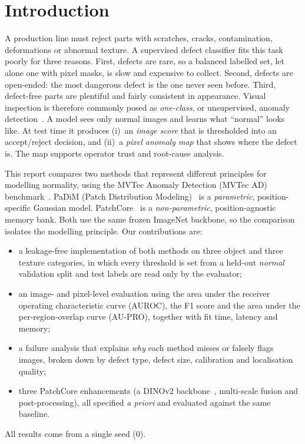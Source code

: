 \section{Introduction}
\label{sec:intro}

A production line must reject parts with scratches, cracks, contamination, deformations or abnormal texture.
A supervised defect classifier fits this task poorly for three reasons.
First, defects are rare, so a balanced labelled set, let alone one with pixel masks, is slow and expensive to collect.
Second, defects are open-ended: the most dangerous defect is the one never seen before.
Third, defect-free parts are plentiful and fairly consistent in appearance.
Visual inspection is therefore commonly posed as \emph{one-class}, or unsupervised, anomaly detection~\cite{bergmann2019mvtec,bergmann2021mvtec}.
A model sees only normal images and learns what ``normal'' looks like.
At test time it produces (i)~an \emph{image score} that is thresholded into an accept/reject decision, and (ii)~a \emph{pixel anomaly map} that shows where the defect is.
The map supports operator trust and root-cause analysis.

This report compares two methods that represent different principles for modelling normality, using the MVTec Anomaly Detection (MVTec AD) benchmark~\cite{bergmann2019mvtec}.
PaDiM (Patch Distribution Modeling)~\cite{defard2021padim} is a \emph{parametric}, position-specific Gaussian model.
PatchCore~\cite{roth2022patchcore} is a \emph{non-parametric}, position-agnostic memory bank.
Both use the same frozen ImageNet backbone, so the comparison isolates the modelling principle.
Our contributions are:
\begin{itemize}
  \item a leakage-free implementation of both methods on three object and three texture categories, in which every threshold is set from a held-out \emph{normal} validation split and test labels are read only by the evaluator;
  \item an image- and pixel-level evaluation using the area under the receiver operating characteristic curve (AUROC), the F1 score and the area under the per-region-overlap curve (AU-PRO), together with fit time, latency and memory;
  \item a failure analysis that explains \emph{why} each method misses or falsely flags images, broken down by defect type, defect size, calibration and localisation quality;
  \item three PatchCore enhancements (a DINOv2 backbone~\cite{oquab2024dinov2}, multi-scale fusion and post-processing), all specified \emph{a priori} and evaluated against the same baseline.
\end{itemize}
All results come from a single seed (0).
